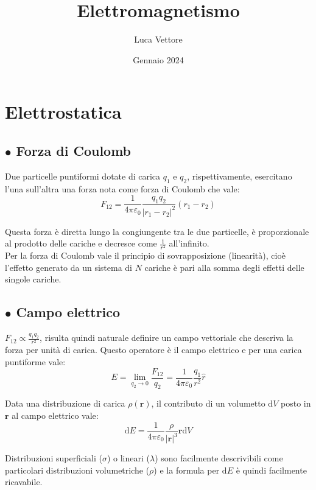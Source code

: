 \documentclass{article}
\title{Elettromagnetismo}
\author{Luca Vettore}
\date{Gennaio 2024}
\begin{document}


\maketitle

\section*{Elettrostatica}




\subsection*{$\bullet$ Forza di Coulomb}

Due particelle puntiformi dotate di carica \(q_1\) e \(q_2\), rispettivamente, esercitano l'una sull'altra una forza nota come forza di Coulomb che vale:
\[
F_{12} = \frac{1}{4\pi\varepsilon_0}\frac{q_1q_2}{|r_1-r_2|^2}(r_1-r_2)
\]

Questa forza è diretta lungo la congiungente tra le due particelle, è proporzionale al prodotto delle cariche e decresce come \(\frac{1}{r^2}\) all'infinito.\\

Per la forza di Coulomb vale il principio di sovrapposizione (linearità), cioè l'effetto generato da un sistema di \(N\) cariche è pari alla somma degli effetti delle singole cariche.

\subsection*{$\bullet$ Campo elettrico}

\( F_{12} \propto \frac{q_1q_2}{r^2} \), risulta quindi naturale definire un campo vettoriale che descriva la forza per unità di carica. Questo operatore è il campo elettrico e per una carica puntiforme vale:
\[
E = \lim_{q_2 \to 0} \frac{F_{12}}{q_2} = \frac{1}{4\pi\varepsilon_0} \frac{q_1}{r^2} \hat{r}
\]

Data una distribuzione di carica \( \rho(\mathbf{r}) \), il contributo di un volumetto \( \mathrm{d}V \) posto in \( \mathbf{r} \) al campo elettrico vale:
\[
\mathrm{d}E = \frac{1}{4\pi\varepsilon_0} \frac{\rho}{|\mathbf{r}|^3} \mathbf{r} \mathrm{d}V
\]

Distribuzioni superficiali (\( \sigma \)) o lineari (\( \lambda \)) sono facilmente descrivibili come particolari distribuzioni volumetriche (\( \rho \)) e la formula per \( \mathrm{d}E \) è quindi facilmente ricavabile.
\end{document}
